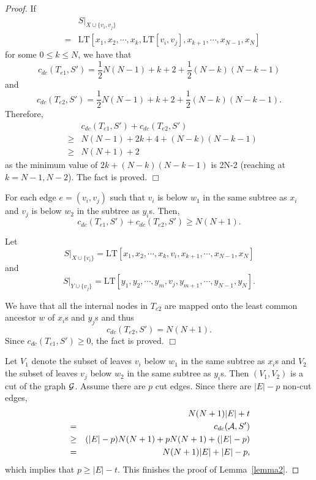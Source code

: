 \documentclass[9.5pt,journal,letterpaper,compsoc]{IEEEtran}
\begin{document}
\begin{proof}
    If
    \begin{eqnarray*}
    && S|_{X\cup \{v_i, v_j\}}\\
    &=&\mbox{LT}[x_1, x_2, \cdots, x_k,
 \mbox{LT}[v_i, v_j],  x_{k+1},
    \cdots, x_{N-1},  x_{N}]
    \end{eqnarray*}
    for some $0\leq k\leq N$,
  we have that
  {\small
     $$ c_{dc}\left(T_{e1}, S'\right)
  = \frac{1}{2}N(N-1)+k+2 + \frac{1}{2}(N-k)(N-k-1)$$
  }
  and
  {\small
   $$c_{dc}\left(T_{e2}, S'\right)
  = \frac{1}{2}N(N-1)+k+2 + \frac{1}{2}(N-k)(N-k-1).$$
  }
Therefore,
\begin{eqnarray*}
 & & c_{dc}\left(T_{e1}, S'\right)+ c_{dc}\left(T_{e2}, S'\right)\\
 & \geq & N(N-1) + 2k+4 + (N-k)(N-k-1)\\
 &  \geq &  N(N+1)+2
\end{eqnarray*}
as the minimum value of $2k+(N-k)(N-k-1)$ is  2N-2 (reaching at $k=N-1, N-2$).
The fact is proved. $\Box$
\vspace{0.5em}

  For each edge $e=(v_i, v_j)$ such that
$v_i$ is  below $w_1$ in the same subtree as $x_i$ and $v_j$ is
below $w_2$  in the subtree as $y_i$s. Then,
 $$c_{dc}\left(T_{e1}, S'\right)+ c_{dc}\left(T_{e2}, S'\right)\geq N(N+1).$$

 Let
$$S|_{X\cup \{v_i\}}=\mbox{LT}[x_1, x_2,\cdots,x_{k}, v_i, x_{k+1},
\cdots, x_{N-1}, x_{N}]$$ and
$$S|_{Y\cup \{v_j\}}=\mbox{LT}[y_1, y_2,\cdots,y_{m}, v_j, y_{m+1},
\cdots, y_{N-1}, y_{N}].$$

We have that all the internal nodes in $T_{e2}$ are mapped onto the
least common ancestor $w$  of $x_i$s and $y_j$s and thus
  $$ c_{dc}\left(T_{e2}, S'\right)= N(N+1).$$
Since $c_{dc}\left(T_{e1}, S'\right)\geq 0$, the fact is proved.
$\Box$
\vspace{0.5em}


 Let $V_1$ denote the subset of leaves $v_i$ below $w_1$ in the same subtree as
$x_i$s and $V_2$ the subset of leaves $v_j$ below $w_2$
 in the same subtree as $y_i$s.
Then $(V_1, V_2)$ is a cut of the graph $\cal G$. Assume there are $p$ cut edges.
Since there are $|E|-p$ non-cut edges,
\begin{eqnarray*}
  & & N(N+1)|E|+t\\
  &= & c_{dc}({\cal A}, S')\\
  & \geq & (|E|-p)N(N+1) + pN(N+1) + (|E|-p)\\
  & = & N(N+1)|E| + |E|-p,
  \end{eqnarray*}
which implies that $p\geq |E|-t$. This  finishes the proof of
Lemma~\ref{lemma2}.
\end{proof}
\end{document}
